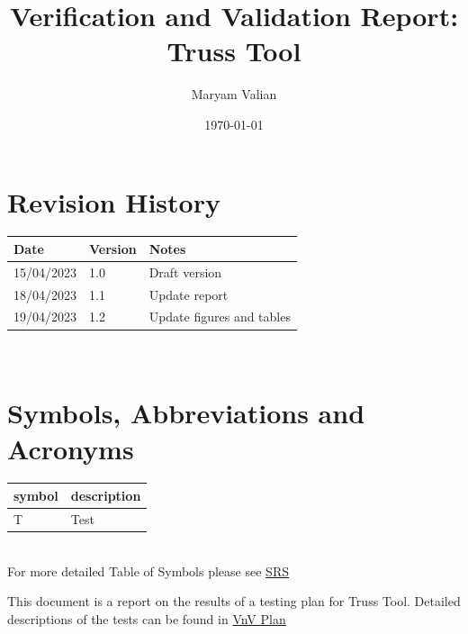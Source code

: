 \documentclass[12pt, titlepage]{article}
\begin{document}
\title{Verification and Validation Report: Truss Tool} 
\author{Maryam Valian}
\date{\today}
	
\maketitle


\section{Revision History}

\begin{tabularx}{\textwidth}{p{3cm}p{2cm}X}
\toprule {\bf Date} & {\bf Version} & {\bf Notes}\\
\midrule
15/04/2023 & 1.0 & Draft version\\
18/04/2023 & 1.1 & Update report\\
19/04/2023 & 1.2 & Update figures and tables\\
\bottomrule
\end{tabularx}

~\newpage

\section{Symbols, Abbreviations and Acronyms}

\renewcommand{\arraystretch}{1.2}
\begin{tabular}{l l} 
  \toprule		
  \textbf{symbol} & \textbf{description}\\
  \midrule 
  T & Test\\
  \bottomrule
\end{tabular}\\

For more detailed Table of Symbols please see \href{https://github.com/Maryamvalian/project741/blob/cfe06182f41c842e3b44aa0eb33d661cf8a3ce79/docs/SRS/SRS.pdf}{SRS}
\newpage

\tableofcontents

\listoftables %

\listoffigures %

\newpage


This document is a report on the results of a testing plan for Truss Tool.
Detailed descriptions of the tests can be found in \href{https://github.com/Maryamvalian/project741/blob/cfe06182f41c842e3b44aa0eb33d661cf8a3ce79/docs/VnVPlan/VnVPlan.pdf}{VnV Plan}
\end{document}
